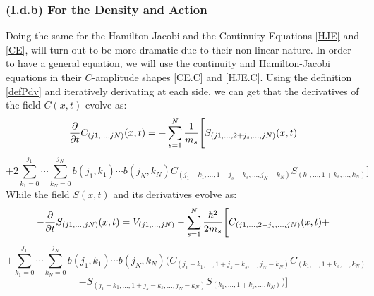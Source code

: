 \documentclass[11pt, a4paper]{article} %
\begin{document}
\subsubsection*{(I.d.b) For the Density and Action}
\vspace{-0.3cm}
Doing the same for the Hamilton-Jacobi and the Continuity Equations \eqref{HJE} and \eqref{CE}, will turn out to be more dramatic due to their non-linear nature. In order to have a general equation, we will use the continuity and Hamilton-Jacobi equations in their $C$-amplitude shapes \eqref{CE.C} and \eqref{HJE.C}. Using the definition \eqref{defPdv} and iteratively derivating at each side, we can get that the derivatives of the field $C(x,t)$ evolve as:\vspace{-0.2cm}
\begin{equation}\label{infchain.CE}
\pdv{}{t}C_{(j1,...,jN)}(x,t)=-\sum_{s=1}^N\frac{1}{m_s} \Bigg[S_{(j1,...,2+j_s,...,jN)}(x,t) 
\end{equation}
$$
+2 \sum_{k_1=0}^{j_1}\cdots\sum_{k_N=0}^{j_N} b(j_1,k_1)\cdots b(j_N,k_N)C_{(j_1-k_1,...,1+j_s-k_s,...,j_N-k_N)}S_{(k_1,...,1+k_s,...,k_N)} \Bigg]
$$
While the field $S(x,t)$ and its derivatives evolve as:
\begin{equation}\label{infchain.HJE}
-\pdv{}{t}S_{(j1,...,jN)}(x,t)=V_{(j1,...,jN)}-\sum_{s=1}^N\frac{\hbar^2}{2m_s} \Bigg[ C_{(j1,...,2+j_s,...,jN)}(x,t)+
\end{equation}
$$
+\sum_{k_1=0}^{j_1}\cdots\sum_{k_N=0}^{j_N} b(j_1,k_1)\cdots b(j_N,k_N) \Bigg( C_{(j_1-k_1,...,1+j_s-k_s,...,j_N-k_N)}C_{(k_1,...,1+k_s,...,k_N)} 
$$
$$
-S_{(j_1-k_1,...,1+j_s-k_s,...,j_N-k_N)}S_{(k_1,...,1+k_s,...,k_N)}  \Bigg)\Bigg]
$$
\end{document}
